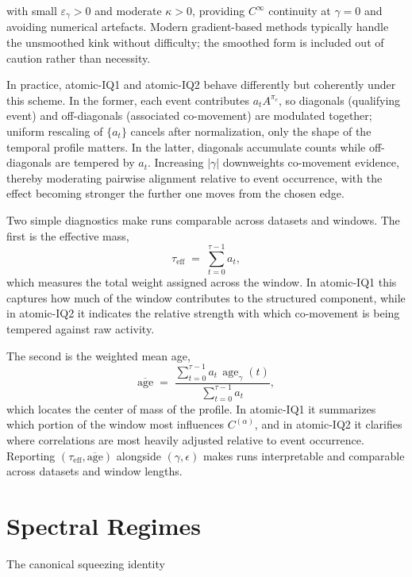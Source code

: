 \documentclass[12pt,letterpaper]{article}
\begin{document}
with small $\varepsilon_\gamma>0$ and moderate $\kappa>0$, providing $C^\infty$ continuity at $\gamma=0$ and avoiding numerical artefacts. Modern gradient-based methods typically handle the unsmoothed kink without difficulty; the smoothed form is included out of caution rather than necessity.

In practice, atomic-IQ1 and atomic-IQ2 behave differently but coherently under this scheme. In the former, each event contributes $a_t A^{\pi_e}$, so diagonals (qualifying event) and off-diagonals (associated co-movement) are modulated together; uniform rescaling of $\{a_t\}$ cancels after normalization, only the shape of the temporal profile matters. In the latter, diagonals accumulate counts while off-diagonals are tempered by $a_t$. Increasing $|\gamma|$ downweights co-movement evidence, thereby moderating pairwise alignment relative to event occurrence, with the effect becoming stronger the further one moves from the chosen edge.

Two simple diagnostics make runs comparable across datasets and windows. The first is the effective mass,
\begin{equation}
\tau_{\mathrm{eff}} \;=\; \sum_{t=0}^{\tau-1} a_t,
\label{eq:meff}
\end{equation}
which measures the total weight assigned across the window. In atomic-IQ1 this captures how much of the window contributes to the structured component, while in atomic-IQ2 it indicates the relative strength with which co-movement is being tempered against raw activity. 

The second is the weighted mean age,
\begin{equation}
\overline{\mathrm{age}} \;=\; 
\frac{\sum_{t=0}^{\tau-1} a_t\,\operatorname{age}_\gamma(t)}
{\sum_{t=0}^{\tau-1} a_t},
\label{eq:age-mean}
\end{equation}
which locates the center of mass of the profile. In atomic-IQ1 it summarizes which portion of the window most influences $C^{(\alpha)}$, and in atomic-IQ2 it clarifies where correlations are most heavily adjusted relative to event occurrence. Reporting $(\tau_{\mathrm{eff}}, \overline{\mathrm{age}})$ alongside $(\gamma,\epsilon)$ makes runs interpretable and comparable across datasets and window lengths.

\section{Spectral Regimes}
\label{sec:SpectralRegimes}
The canonical squeezing identity
\end{document}
